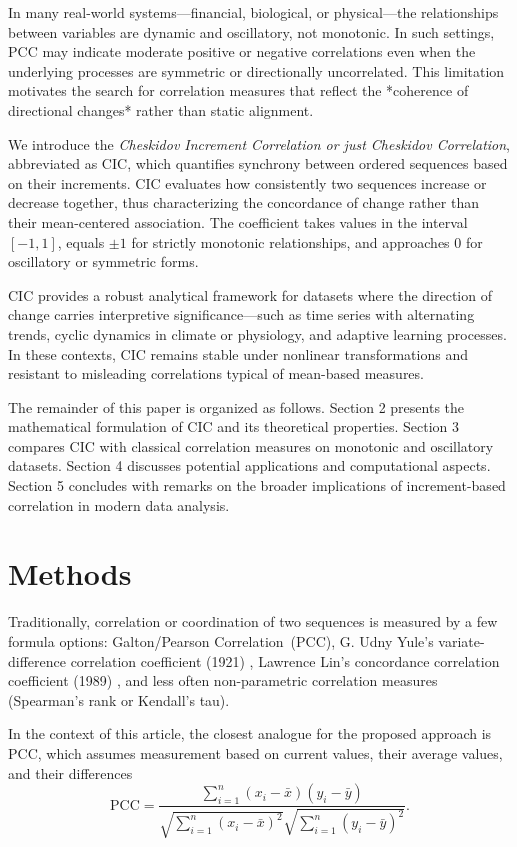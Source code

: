 \documentclass[aos]{imsart}
\newcommand{\cic}{\text{CIC}}
\newcommand{\cicFull}{\textnormal{Cheskidov Correlation}}
\newcommand{\pcc}{\text{PCC}}
\newcommand{\pccFull}{\textnormal{Galton/Pearson Correlation}}
\begin{document}
In many real-world systems—financial, biological, or physical—the relationships between variables are dynamic and oscillatory, not monotonic. In such settings, $\pcc$ may indicate moderate positive or negative correlations even when the underlying processes are symmetric or directionally uncorrelated. This limitation motivates the search for correlation measures that reflect the *coherence of directional changes* rather than static alignment.

We introduce the \textit{Cheskidov Increment Correlation or just \cicFull}, abbreviated as $\cic$, which quantifies synchrony between ordered sequences based on their increments. $\cic$ evaluates how consistently two sequences increase or decrease together, thus characterizing the concordance of change rather than their mean-centered association. The coefficient takes values in the interval $[-1, 1]$, equals $\pm 1$ for strictly monotonic relationships, and approaches $0$ for oscillatory or symmetric forms.

$\cic$ provides a robust analytical framework for datasets where the direction of change carries interpretive significance—such as time series with alternating trends, cyclic dynamics in climate or physiology, and adaptive learning processes. In these contexts, $\cic$ remains stable under nonlinear transformations and resistant to misleading correlations typical of mean-based measures.

The remainder of this paper is organized as follows. Section 2 presents the mathematical formulation of $\cic$ and its theoretical properties. Section 3 compares $\cic$ with classical correlation measures on monotonic and oscillatory datasets. Section 4 discusses potential applications and computational aspects. Section 5 concludes with remarks on the broader implications of increment-based correlation in modern data analysis.

\section{Methods}

Traditionally, correlation or coordination of two sequences is measured by a few formula options: \pccFull\ ($\pcc$), G. Udny Yule’s variate-difference correlation coefficient (1921) \cite{r1}, Lawrence Lin’s concordance correlation coefficient (1989) \cite{r2}, and less often non-parametric correlation measures (Spearman’s rank or Kendall’s tau).

In the context of this article, the closest analogue for the proposed approach is $\pcc$, which assumes measurement based on current values, their average values, and their differences
\begin{equation}
\text{$\pcc$} = \frac{\sum_{i=1}^n (x_i - \bar{x})(y_i - \bar{y})}{\sqrt{\sum_{i=1}^n (x_i - \bar{x})^2}\sqrt{\sum_{i=1}^n (y_i - \bar{y})^2}}.
\end{equation}
\end{document}
